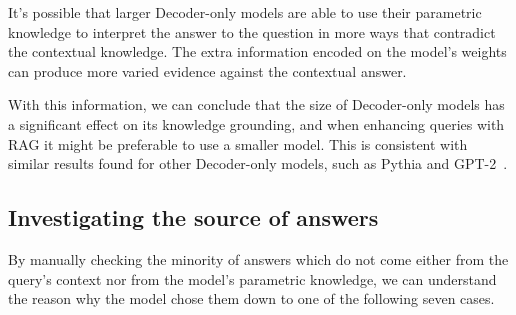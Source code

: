 It's possible that larger Decoder-only models are able to use their parametric knowledge to interpret the answer to the question in more ways that contradict the contextual knowledge.
The extra information encoded on the model's weights can produce more varied evidence against the contextual answer.

With this information, we can conclude that the size of Decoder-only models has a significant effect on its knowledge grounding, and when enhancing queries with RAG it might be preferable to use a smaller model.
This is consistent with similar results found for other Decoder-only models, such as Pythia and GPT-2~\cite{factual_recall}.

\subsection{Investigating the source of \Other{} answers}
\label{what_are_all_these_others}

By manually checking the minority of answers which do not come either from the query's context nor from the model's parametric knowledge, we can understand the reason why the model chose them down to one of the following seven cases.


